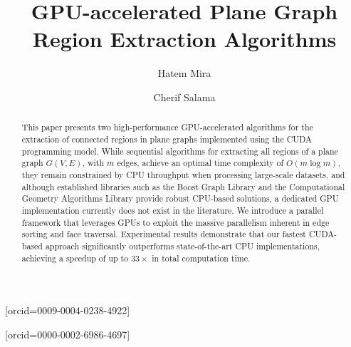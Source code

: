 \documentclass[a4paper,fleqn]{cas-dc}
\begin{document}
\let\WriteBookmarks\relax
\def\floatpagepagefraction{1}
\def\textpagefraction{.001}

\title [mode = title]{GPU-accelerated Plane Graph Region Extraction Algorithms}


\author[1]{Hatem Mira}
[orcid=0009-0004-0238-4922]
\cormark[1]


\author[1]{Cherif Salama}
[orcid=0000-0002-6986-4697]
\cormark[2]




\begin{abstract}
This paper presents two high-performance GPU-accelerated algorithms for the extraction of connected regions in plane graphs implemented using the CUDA programming model. While sequential algorithms for extracting all regions of a plane graph $G(V, E)$, with $m$ edges, achieve an optimal time complexity of $O(m \log m)$, they remain constrained by CPU throughput when processing large-scale datasets, and although established libraries such as the Boost Graph Library and the Computational Geometry Algorithms Library provide robust CPU-based solutions, a dedicated GPU implementation currently does not exist in the literature. We introduce a parallel framework that leverages GPUs to exploit the massive parallelism inherent in edge sorting and face traversal.  Experimental results demonstrate that our fastest CUDA-based approach significantly outperforms state-of-the-art CPU implementations, achieving a speedup of up to $33\times$ in total computation time.
\end{abstract}
\end{document}
